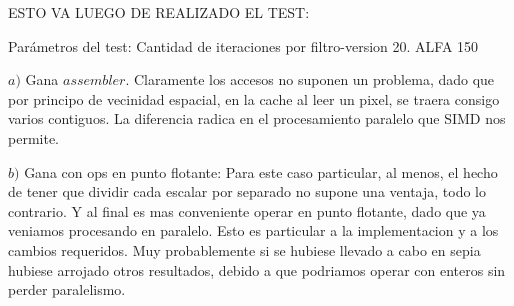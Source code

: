 ESTO VA LUEGO DE REALIZADO EL TEST:

Parámetros del test: 
Cantidad de iteraciones por filtro-version 20.
ALFA 150

$a)$ Gana $assembler$. Claramente los accesos no suponen un problema, dado que por principo de vecinidad espacial, en la cache al leer un pixel, se traera consigo varios contiguos. La diferencia radica en el procesamiento paralelo que SIMD nos permite.

$b)$ Gana con ops en punto flotante: Para este caso particular, al menos, el hecho de tener que dividir cada escalar por separado no supone una ventaja, todo lo contrario. Y al final es mas conveniente operar en punto flotante, dado que ya veniamos procesando en paralelo. Esto es particular a la implementacion y a los cambios requeridos. Muy probablemente si se hubiese llevado a cabo en sepia hubiese arrojado otros resultados, debido a que podriamos operar con enteros sin perder paralelismo.
